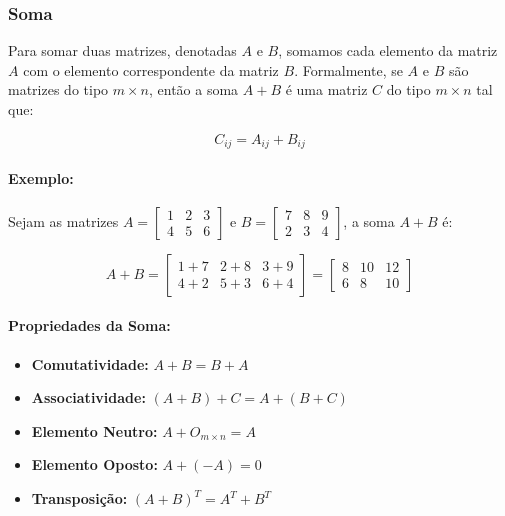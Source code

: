 \subsubsection{Soma}
\indent

Para somar duas matrizes, denotadas $A$ e $B$, somamos cada elemento da matriz $A$ com o elemento correspondente da matriz $B$. Formalmente, se $A$ e $B$ são matrizes do tipo $m \times n$, então a soma $A + B$ é uma matriz $C$ do tipo $m \times n$ tal que:

\[ 
    C_{ij} = A_{ij} + B_{ij} 
\]

\paragraph{Exemplo:}

Sejam as matrizes $A = \begin{bmatrix}
    1 & 2 & 3 \\
    4 & 5 & 6
\end{bmatrix}$ e $B = \begin{bmatrix}
    7 & 8 & 9 \\
    2 & 3 & 4
\end{bmatrix}$, a soma $A + B$ é:

\[ 
    A + B = \begin{bmatrix}
        1 + 7 & 2 + 8 & 3 + 9 \\
        4 + 2 & 5 + 3 & 6 + 4
    \end{bmatrix} = \begin{bmatrix}
        8 & 10 & 12 \\
        6 & 8 & 10
    \end{bmatrix}
\]

\paragraph{Propriedades da Soma:}

\begin{itemize}
    \item \textbf{Comutatividade:} $A + B = B + A$ 
    \item \textbf{Associatividade:} $(A + B) + C = A + (B + C)$
    \item \textbf{Elemento Neutro:} $A + O_{m \times n} = A$
    \item \textbf{Elemento Oposto:} $A + (-A) = 0$
    \item \textbf{Transposição:} ${(A + B)}^T = A^T + B^T$
\end{itemize}

